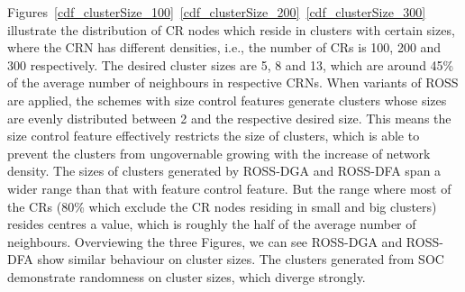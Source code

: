 \documentclass[journal,comsoc]{IEEEtran}
\theoremstyle{mytheoremstyle}
\theoremstyle{mytheoremstyle}
\theoremstyle{mytheoremstyle}
\newcommand{\ie}{i.e., }
\begin{document}

Figures~\ref{cdf_clusterSize_100}~\ref{cdf_clusterSize_200}~\ref{cdf_clusterSize_300} illustrate the distribution of CR nodes which reside in clusters with certain sizes, where the CRN has different densities, \ie the number of CRs is 100, 200 and 300 respectively.
The desired cluster sizes are 5, 8 and 13, which are around 45\% of the average number of neighbours in respective CRNs. 
When variants of ROSS are applied, the schemes with size control features generate clusters whose sizes are evenly distributed between 2 and the respective desired size.
This means the size control feature effectively restricts the size of clusters, which is able to prevent the clusters from ungovernable growing with the increase of network density.
The sizes of clusters generated by ROSS-DGA and ROSS-DFA span a wider range than that with feature control feature.
But the range where most of the CRs (80\% which exclude the CR nodes residing in small and big clusters) resides centres a value, which is roughly the half of the average number of neighbours.
Overviewing the three Figures, we can see ROSS-DGA and ROSS-DFA show similar behaviour on cluster sizes.
The clusters generated from SOC demonstrate randomness on cluster sizes, which diverge strongly.
\end{document}
